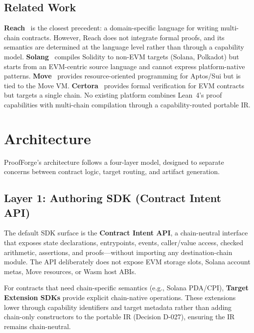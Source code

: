 \documentclass[sigconf]{acmart}
\begin{document}
\subsection{Related Work}

\textbf{Reach}~\cite{reach} is the closest precedent: a domain-specific language for writing
multi-chain contracts. However, Reach does not integrate formal proofs, and its semantics are
determined at the language level rather than through a capability model. \textbf{Solang}~\cite{solang}
compiles Solidity to non-EVM targets (Solana, Polkadot) but starts from an EVM-centric source
language and cannot express platform-native patterns. \textbf{Move}~\cite{move} provides
resource-oriented programming for Aptos/Sui but is tied to the Move VM. \textbf{Certora}~\cite{certora}
provides formal verification for EVM contracts but targets a single chain. No existing platform
combines Lean~4's proof capabilities with multi-chain compilation through a capability-routed
portable IR.

\section{Architecture}
\label{sec:arch}

ProofForge's architecture follows a four-layer model, designed to separate concerns between
contract logic, target routing, and artifact generation.

\subsection{Layer 1: Authoring SDK (Contract Intent API)}

The default SDK surface is the \textbf{Contract Intent API}, a chain-neutral interface that
exposes state declarations, entrypoints, events, caller/value access, checked arithmetic,
assertions, and proofs---without importing any destination-chain module. The API deliberately
does not expose EVM storage slots, Solana account metas, Move resources, or Wasm host ABIs.

For contracts that need chain-specific semantics (e.g., Solana PDA/CPI),
\textbf{Target Extension SDKs} provide explicit chain-native operations. These extensions lower
through capability identifiers and target metadata rather than adding chain-only constructors
to the portable IR (Decision D-027), ensuring the IR remains chain-neutral.
\end{document}
